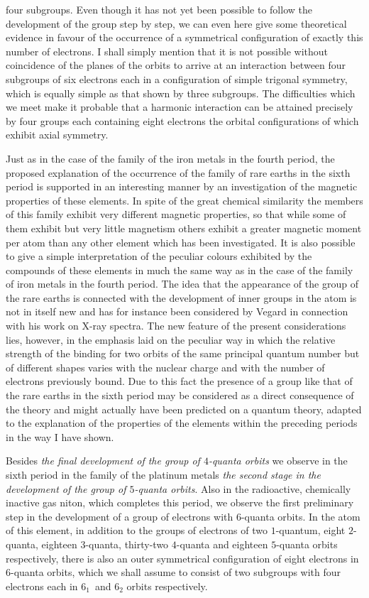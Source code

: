 four subgroups. Even though it has not yet been possible to follow
the development of the group step by step, we can even here give
some theoretical evidence in favour of the occurrence of a symmetrical
configuration of exactly this number of electrons. I shall
simply mention that it is not possible without coincidence of the
planes of the orbits to arrive at an interaction between four subgroups
of six electrons each in a configuration of simple trigonal
symmetry, which is equally simple as that shown by three subgroups.
The difficulties which we meet make it probable that a harmonic
interaction can be attained precisely by four groups each containing
eight electrons the orbital configurations of which exhibit axial
symmetry.

Just as in the case of the family of the iron metals in the fourth
period, the proposed explanation of the occurrence of the family of
rare earths in the sixth period is supported in an interesting
manner by an investigation of the magnetic properties of these
elements. In spite of the great chemical similarity the members
of this family exhibit very different magnetic properties, so that
while some of them exhibit but very little magnetism others exhibit
a greater magnetic moment per atom than any other element which
has been investigated. It is also possible to give a simple interpretation
of the peculiar colours exhibited by the compounds of these
elements in much the same way as in the case of the family of iron
metals in the fourth period. The idea that the appearance of the
group of the rare earths is connected with the development of inner
groups in the atom is not in itself new and has for instance been
considered by Vegard in connection with his work on X-ray spectra.
The new feature of the present considerations lies, however, in the
emphasis laid on the peculiar way in which the relative strength of
the binding for two orbits of the same principal quantum number
but of different shapes varies with the nuclear charge and with the
number of electrons previously bound. Due to this fact the presence
of a group like that of the rare earths in the sixth period may be
considered as a direct consequence of the theory and might actually
have been predicted on a quantum theory, adapted to the explanation
of the properties of the elements within the preceding periods
in the way I have shown.

Besides \emph{the final development of the group of $4$-quanta orbits} we
observe in the sixth period in the family of the platinum metals \emph{the
second stage in the development of the group of $5$-quanta orbits}.
Also in the radioactive, chemically inactive gas niton, which completes
this period, we observe the first preliminary step in the
development of a group of electrons with $6$-quanta orbits. In the
atom of this element, in addition to the groups of electrons of two
$1$-quantum, eight $2$-quanta, eighteen $3$-quanta, thirty-two $4$-quanta
and eighteen $5$-quanta orbits respectively, there is also an outer
symmetrical configuration of eight electrons in $6$-quanta orbits,
which we shall assume to consist of two subgroups with four electrons
each in $6_{1}$~and $6_{2}$ orbits respectively.

